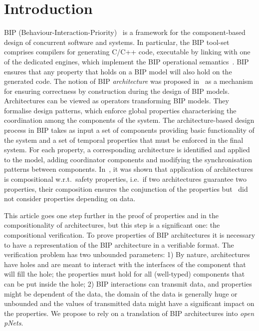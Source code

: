 \documentclass{llncs}
\newcommand{\newCoord}[1]{{\color{blue}#1}}
\newcommand{\ie}[1][\ ]{i.e.#1}
\newcommand{\eg}[1][\ ]{e.g.#1}
\newcommand{\wrt}[1][\ ]{w.r.t.#1}
\begin{document}

\section{Introduction}
\label{secn:introduction}

BIP (Behaviour-Interaction-Priority)~\cite{bip} is a framework for the
component-based design of concurrent software and systems.  In
particular, the BIP tool-set comprises compilers for generating C/C++
code, executable by linking with one of the dedicated engines, which
implement the BIP operational semantics~\cite{BliSif08-acp-tc}.
BIP ensures that any property that holds on a BIP
model will also hold on the generated code.
The notion of BIP \emph{architecture} was proposed
in~\cite{AttieBBJS16-architectures-faoc} as a mechanism for ensuring
correctness by construction during the design of BIP models.
Architectures can be viewed as operators transforming BIP models.
They formalise design patterns, which enforce global properties
characterising the coordination among the components of the system.
The architecture-based design process in BIP takes as input a set of
components providing basic functionality of the system and a set of
temporal properties that must be enforced in the final system.  For
each property, a corresponding architecture is identified
and applied to the model, adding
coordinator components and modifying the 
synchronisation patterns between components.
In~\cite{AttieBBJS16-architectures-faoc}, it was shown that
application of architectures is compositional \wrt safety properties,
\ie if two architectures guarantee two properties, their composition ensures the conjunction of the properties \newCoord{but~\cite{AttieBBJS16-architectures-faoc} did not consider properties depending on data}.
%

This article goes one step further in the proof of properties and in the compositionality of architectures, but this step is a significant one: the compositional verification. To prove properties of BIP architectures
it is necessary to have a representation of the BIP architecture in a verifiable format. 
The verification problem has two unbounded parameters: 1) By nature, architectures have holes and are meant to interact with the interfaces of the component that will fill the hole; the properties must hold for all (well-typed) components that can be put inside the hole; 2) BIP interactions can transmit data, and properties might be dependent of the data, the domain of the data is generally huge or unbounded and the values of transmitted data might have a significant impact on the properties.
We propose to rely on a translation of BIP architectures into \emph{open pNets}.  
\end{document}
